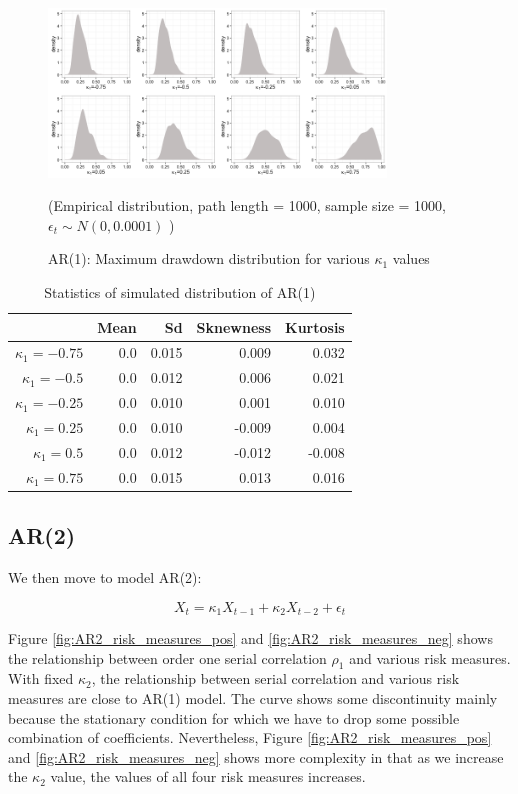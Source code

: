 \documentclass[11pt]{article}
\begin{document}
\begin{figure}[H]
\centering
\includegraphics[width = 0.8\textwidth]{../figures/simulation/AR1_maxDrawdown_dist}
\caption{AR(1): Maximum drawdown distribution for various $\kappa_1$ values }
(Empirical distribution, path length = 1000, sample size = 1000, $\epsilon_t \sim N(0, 0.0001)$ )
\label{fig:AR1_maxDrawdown_dist}
\end{figure}

\begin{table}[H]
\centering
\begin{tabular}{|r |r r r r|}
\hline
& Mean & Sd & Sknewness & Kurtosis \\
\hline
$\kappa_1 = -0.75$ & 0.0 & 0.015 & 0.009 & 0.032\\
$\kappa_1 = -0.5$ & 0.0 & 0.012 & 0.006 & 0.021\\
$\kappa_1 = -0.25$ & 0.0 & 0.010 & 0.001 & 0.010\\
$\kappa_1 = 0.25$ & 0.0 & 0.010 & -0.009 & 0.004\\
$\kappa_1 = 0.5$ & 0.0 & 0.012 & -0.012 & -0.008\\
$\kappa_1 = 0.75$ & 0.0 & 0.015 & 0.013 & 0.016\\
\hline
\end{tabular}
\caption{Statistics of simulated distribution of AR(1)}
\label{table: AR1_return}
\end{table}

\subsection{AR(2)} %

We then move to model AR(2):

\begin{equation}
X_t = \kappa_1X_{t-1} + \kappa_2X_{t-2}  + \epsilon_t
\end{equation}

Figure \ref{fig:AR2_risk_measures_pos} and \ref{fig:AR2_risk_measures_neg} shows the relationship between order one serial correlation $\rho_1$ and various risk measures. With fixed $\kappa_2$, the relationship between serial correlation and various risk measures are close to AR(1) model. The curve shows some discontinuity mainly because the stationary condition for which we have to drop some possible combination of coefficients. Nevertheless, Figure \ref{fig:AR2_risk_measures_pos} and \ref{fig:AR2_risk_measures_neg} shows more complexity in that as we increase the $\kappa_2$ value, the values of all four risk measures increases.
\end{document}
